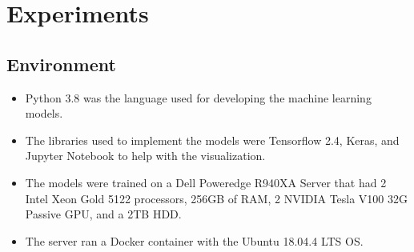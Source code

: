 \graphicspath{ {./figures/} }
\section{Experiments \label{experiments}}
    \subsection{Environment}
        \begin{itemize}
            \item Python 3.8 was the language used for developing the machine learning models. 
            \item The libraries used to implement the models were Tensorflow 2.4, Keras, and Jupyter Notebook to help with the visualization.
            \item The models were trained on a Dell Poweredge R940XA Server that had 2 Intel Xeon Gold 5122 processors, 256GB of RAM, 2 NVIDIA Tesla V100 32G Passive GPU, and a 2TB HDD.
            \item The server ran a Docker container with the Ubuntu 18.04.4 LTS OS.
        \end{itemize}

